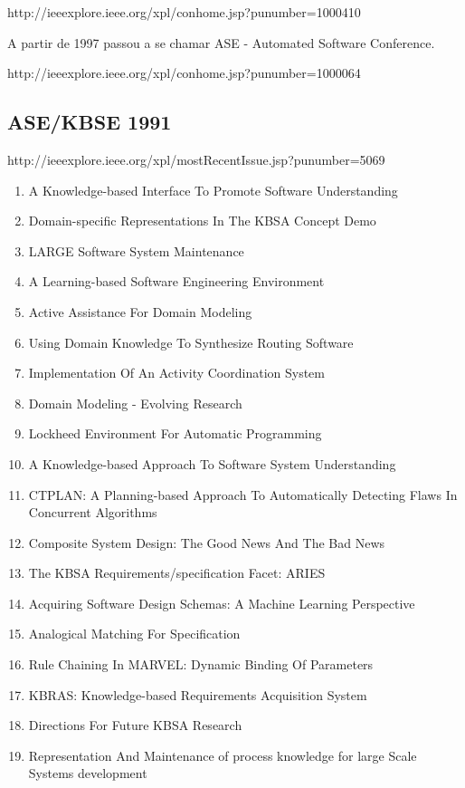 http://ieeexplore.ieee.org/xpl/conhome.jsp?punumber=1000410

A partir de 1997 passou a se chamar ASE - Automated Software Conference.

http://ieeexplore.ieee.org/xpl/conhome.jsp?punumber=1000064

\subsection{ASE/KBSE 1991}

http://ieeexplore.ieee.org/xpl/mostRecentIssue.jsp?punumber=5069

\begin{enumerate}[itemsep=-1ex]
  \item A Knowledge-based Interface To Promote Software Understanding
  \item Domain-specific Representations In The KBSA Concept Demo
  \item LARGE Software System Maintenance
  \item A Learning-based Software Engineering Environment
  \item Active Assistance For Domain Modeling
  \item Using Domain Knowledge To Synthesize Routing Software
  \item Implementation Of An Activity Coordination System
  \item Domain Modeling - Evolving Research
  \item Lockheed Environment For Automatic Programming
  \item A Knowledge-based Approach To Software System Understanding
  \item CTPLAN: A Planning-based Approach To Automatically Detecting Flaws In Concurrent Algorithms
  \item Composite System Design: The Good News And The Bad News
  \item The KBSA Requirements/specification Facet: ARIES
  \item Acquiring Software Design Schemas: A Machine Learning Perspective
  \item Analogical Matching For Specification
  \item Rule Chaining In MARVEL: Dynamic Binding Of Parameters
  \item KBRAS: Knowledge-based Requirements Acquisition System
  \item Directions For Future KBSA Research
  \item Representation And Maintenance of process knowledge for large Scale Systems development

\end{enumerate}
